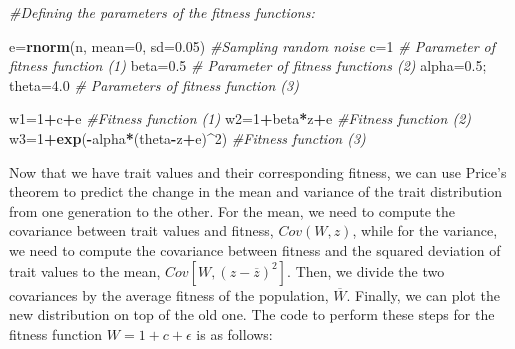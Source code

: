 \documentclass[
]{book}
\newenvironment{Shaded}{\begin{snugshade}}{\end{snugshade}}
\newcommand{\AttributeTok}[1]{\textcolor[rgb]{0.13,0.29,0.53}{#1}}
\newcommand{\CommentTok}[1]{\textcolor[rgb]{0.56,0.35,0.01}{\textit{#1}}}
\newcommand{\DecValTok}[1]{\textcolor[rgb]{0.00,0.00,0.81}{#1}}
\newcommand{\FloatTok}[1]{\textcolor[rgb]{0.00,0.00,0.81}{#1}}
\newcommand{\FunctionTok}[1]{\textcolor[rgb]{0.13,0.29,0.53}{\textbf{#1}}}
\newcommand{\NormalTok}[1]{#1}
\newcommand{\OtherTok}[1]{\textcolor[rgb]{0.56,0.35,0.01}{#1}}
\newcommand{\SpecialCharTok}[1]{\textcolor[rgb]{0.81,0.36,0.00}{\textbf{#1}}}
\begin{document}
\begin{Shaded}
\begin{Highlighting}[]
\CommentTok{\#Defining the parameters of the fitness functions:}

\NormalTok{e}\OtherTok{=}\FunctionTok{rnorm}\NormalTok{(n, }\AttributeTok{mean=}\DecValTok{0}\NormalTok{, }\AttributeTok{sd=}\FloatTok{0.05}\NormalTok{) }\CommentTok{\#Sampling random noise}
\NormalTok{c}\OtherTok{=}\DecValTok{1} \CommentTok{\# Parameter of fitness function (1)}
\NormalTok{beta}\OtherTok{=}\FloatTok{0.5} \CommentTok{\# Parameter of fitness functions (2)}
\NormalTok{alpha}\OtherTok{=}\FloatTok{0.5}\NormalTok{; theta}\OtherTok{=}\FloatTok{4.0} \CommentTok{\# Parameters of fitness function (3)}

\NormalTok{w1}\OtherTok{=}\DecValTok{1}\SpecialCharTok{+}\NormalTok{c}\SpecialCharTok{+}\NormalTok{e }\CommentTok{\#Fitness function (1)}
\NormalTok{w2}\OtherTok{=}\DecValTok{1}\SpecialCharTok{+}\NormalTok{beta}\SpecialCharTok{*}\NormalTok{z}\SpecialCharTok{+}\NormalTok{e }\CommentTok{\#Fitness function (2)}
\NormalTok{w3}\OtherTok{=}\DecValTok{1}\SpecialCharTok{+}\FunctionTok{exp}\NormalTok{(}\SpecialCharTok{{-}}\NormalTok{alpha}\SpecialCharTok{*}\NormalTok{(theta}\SpecialCharTok{{-}}\NormalTok{z}\SpecialCharTok{+}\NormalTok{e)}\SpecialCharTok{\^{}}\DecValTok{2}\NormalTok{) }\CommentTok{\#Fitness function (3)}
\end{Highlighting}
\end{Shaded}

Now that we have trait values and their corresponding fitness, we can use Price's theorem to predict the change in the mean and variance of the trait distribution from one generation to the other. For the mean, we need to compute the covariance between trait values and fitness, \(Cov(W,z)\), while for the variance, we need to compute the covariance between fitness and the squared deviation of trait values to the mean, \(Cov\left[W, (z-\overline{z})^2\right]\). Then, we divide the two covariances by the average fitness of the population, \(\overline{W}\). Finally, we can plot the new distribution on top of the old one. The code to perform these steps for the fitness function \(W=1+c+\epsilon\) is as follows:
\end{document}

